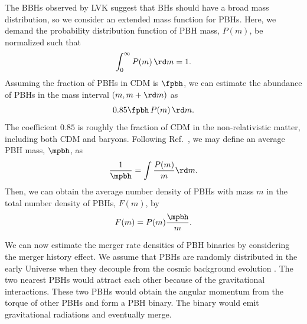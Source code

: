 \documentclass[
reprint,           %
superscriptaddress,%
amsmath,           %
amssymb,           %
aps,               %
prd,               %
notitlepage,       %
longbibliography,  %
floatfix,          %
nofootinbib,
]{revtex4-1}
\def\e{\begin{equation}}
\def\q{\end{equation}}
\begin{document}
The BBHs observed by LVK suggest that BHs should have a broad mass distribution, so we consider an extended mass function for PBHs. Here, we demand the probability distribution function of PBH mass, $P(m)$, be normalized such that
\e\label{norm}
\int_{0}^{\infty} P(m)\, \rd m = 1.
\q 
Assuming the fraction of PBHs in CDM is $\fpbh$, we can estimate the abundance of PBHs in the mass interval $(m, m+\rd m)$ as \cite{Chen:2018rzo}
\e 
0.85 \fpbh\, P(m)\, \rd m.
\q 
The coefficient $0.85$ is roughly the fraction of CDM in the non-relativistic matter, including both CDM and baryons. Following Ref.~\cite{Liu:2019rnx}, we may define an average PBH mass, $\mpbh$, as
\e\label{mpbh}
\frac{1}{\mpbh} = \int \frac{P(m)}{m} \rd m.
\q 
Then, we can obtain the average number density of PBHs with mass $m$ in the 
total number density of PBHs, $F(m)$, by \cite{Liu:2019rnx}
\e\label{Fm} 
F(m) = P(m) \frac{\mpbh}{m}.
\q 

We can now estimate the merger rate densities of PBH binaries by considering the merger history effect.
We assume that PBHs are randomly distributed in the early Universe when they decouple from the cosmic background evolution \cite{Nakamura:1997sm,Sasaki:2016jop,Ali-Haimoud:2017rtz}. The two nearest PBHs would attract each other because of the gravitational interactions. These two PBHs would obtain the angular momentum from the torque of other PBHs and form a PBH binary. The binary would emit gravitational radiations and eventually merge. 
\end{document}
